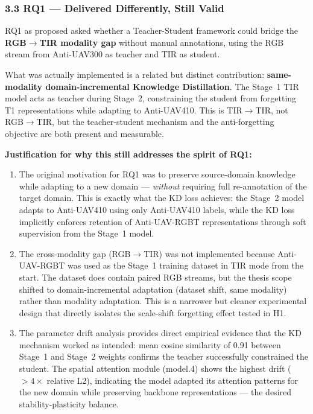 \subsubsection*{3.3 RQ1 — Delivered Differently, Still Valid}

RQ1 as proposed asked whether a Teacher-Student framework could bridge
the \textbf{RGB$\to$TIR modality gap} without manual annotations,
using the RGB stream from Anti-UAV300 as teacher and TIR as student.

\noindent What was actually implemented is a related but distinct
contribution: \textbf{same-modality domain-incremental Knowledge
Distillation}. The Stage~1 TIR model acts as teacher during Stage~2,
constraining the student from forgetting T1 representations while
adapting to Anti-UAV410. This is TIR$\to$TIR, not RGB$\to$TIR, but
the teacher-student mechanism and the anti-forgetting objective are
both present and measurable.

\noindent \textbf{Justification for why this still addresses the spirit
of RQ1:}

\begin{enumerate}
    \item The original motivation for RQ1 was to preserve source-domain
    knowledge while adapting to a new domain — \textit{without} requiring
    full re-annotation of the target domain. This is exactly what the
    KD loss achieves: the Stage~2 model adapts to Anti-UAV410 using only
    Anti-UAV410 labels, while the KD loss implicitly enforces retention
    of Anti-UAV-RGBT representations through soft supervision from the
    Stage~1 model.

    \item The cross-modality gap (RGB$\to$TIR) was not implemented because
    Anti-UAV-RGBT was used as the Stage~1 training dataset in TIR mode
    from the start. The dataset does contain paired RGB streams, but
    the thesis scope shifted to domain-incremental adaptation (dataset
    shift, same modality) rather than modality adaptation. This is a
    narrower but cleaner experimental design that directly isolates the
    scale-shift forgetting effect tested in H1.

    \item The parameter drift analysis provides direct empirical evidence
    that the KD mechanism worked as intended: mean cosine similarity of
    0.91 between Stage~1 and Stage~2 weights confirms the teacher
    successfully constrained the student. The spatial attention module
    (model.4) shows the highest drift ($>4\times$ relative L2), indicating
    the model adapted its attention patterns for the new domain while
    preserving backbone representations — the desired stability-plasticity
    balance.
\end{enumerate}

